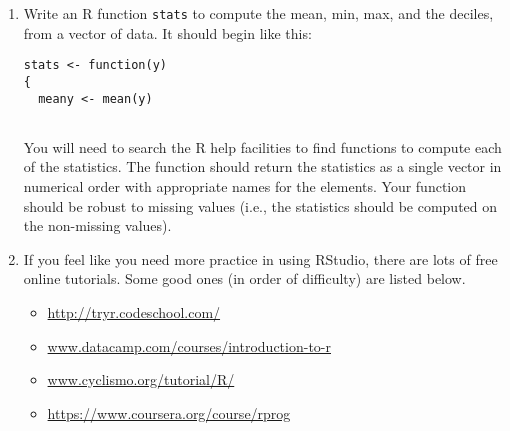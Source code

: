 \documentclass[11pt]{article}
\begin{document}
\begin{enumerate}
\item Write an R function \verb|stats| to compute the mean, min, max, and the deciles, from a vector of data. It should begin like this:
\begin{verbatim}
stats <- function(y)
{
  meany <- mean(y)
  
\end{verbatim}
You will need to search the R help facilities to find functions to compute each of the statistics. The function should return the statistics as a single vector in numerical order with appropriate names for the elements. Your function should be robust to missing values (i.e., the statistics should be computed on the non-missing values).

\item If you feel like you need more practice in using RStudio, there are lots of free online tutorials. Some good ones (in order of difficulty) are listed below.
\begin{itemize}
\item \url{http://tryr.codeschool.com/}
\item \url{www.datacamp.com/courses/introduction-to-r} 
\item \url{www.cyclismo.org/tutorial/R/}
\item \url{https://www.coursera.org/course/rprog}
\end{itemize}

\end{enumerate}
\end{document}

